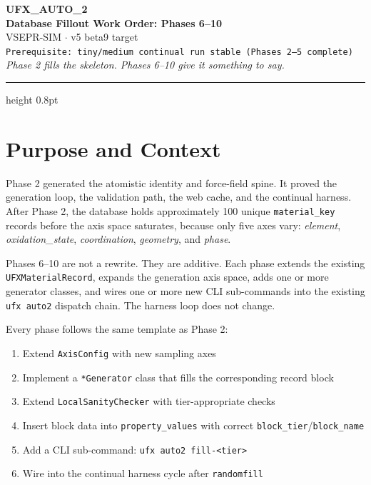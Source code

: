 \documentclass[11pt, a4paper]{article}
\begin{document}
\begin{center}
  {\LARGE\bfseries UFX\_AUTO\_2}\\[4pt]
  {\large\bfseries Database Fillout Work Order: Phases 6--10}\\[6pt]
  {\normalsize VSEPR-SIM $\cdot$ v5 beta9 target}\\[3pt]
  {\small\texttt{Prerequisite: tiny/medium continual run stable (Phases 2--5 complete)}}\\[3pt]
  {\small\textit{Phase 2 fills the skeleton. Phases 6--10 give it something to say.}}
\end{center}

\vspace{4pt}
\hrule height 0.8pt
\vspace{10pt}

\tableofcontents
\newpage

\section{Purpose and Context}

Phase 2 generated the atomistic identity and force-field spine.  It proved the
generation loop, the validation path, the web cache, and the continual harness.
After Phase 2, the database holds approximately 100 unique \texttt{material\_key}
records before the axis space saturates, because only five axes vary:
\textit{element}, \textit{oxidation\_state}, \textit{coordination},
\textit{geometry}, and \textit{phase}.

\begin{rulebox}
Phases 6--10 are not a rewrite.  They are additive.  Each phase extends the
existing \texttt{UFXMaterialRecord}, expands the generation axis space, adds one
or more generator classes, and wires one or more new CLI sub-commands into the
existing \texttt{ufx auto2} dispatch chain.  The harness loop does not change.
\end{rulebox}

Every phase follows the same template as Phase 2:

\begin{enumerate}[leftmargin=*, itemsep=2pt]
  \item Extend \texttt{AxisConfig} with new sampling axes
  \item Implement a \texttt{*Generator} class that fills the corresponding record block
  \item Extend \texttt{LocalSanityChecker} with tier-appropriate checks
  \item Insert block data into \texttt{property\_values} with correct \texttt{block\_tier}/\texttt{block\_name}
  \item Add a CLI sub-command: \texttt{ufx auto2 fill-<tier>}
  \item Wire into the continual harness cycle after \texttt{randomfill}
\end{enumerate}
\end{document}
